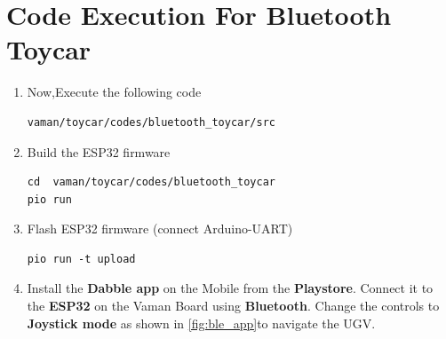 \section{Code Execution For Bluetooth Toycar}
\begin{enumerate}[label=\thesection.\arabic*.,ref=\thesection.\theenumi]
\item Now,Execute the following code
\begin{lstlisting}
vaman/toycar/codes/bluetooth_toycar/src
\end{lstlisting}

\item Build the ESP32 firmware
\begin{lstlisting}
cd  vaman/toycar/codes/bluetooth_toycar
pio run
\end{lstlisting} 

\item Flash ESP32 firmware (connect Arduino-UART)
\begin{lstlisting}
pio run -t upload
\end{lstlisting} 
\item Install the \textbf{Dabble app} on the Mobile from the \textbf{Playstore}. Connect it to the \textbf{ESP32} on the Vaman Board using \textbf{Bluetooth}. Change the controls to \textbf{Joystick mode} as shown in \autoref{fig:ble_app}to navigate the UGV.\\
\end{enumerate}

